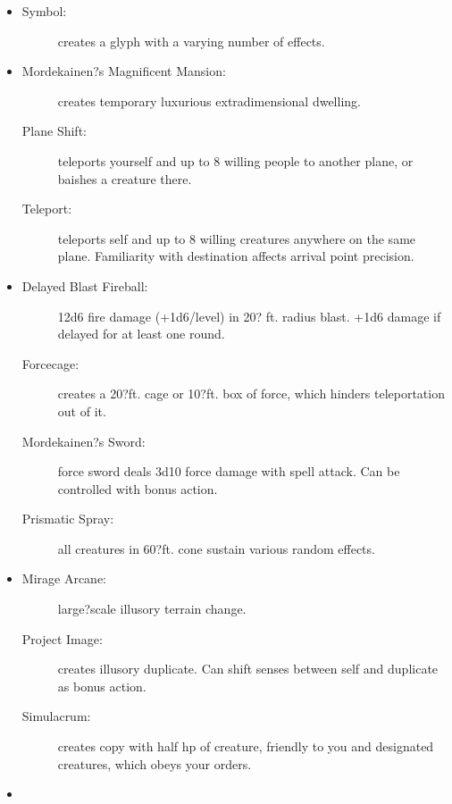 \documentclass[DIV=14, paper=a4, fontsize=10pt, twocolumn, twoside]{scrartcl}
\begin{document}
\begin{itemize}[align=parleft,labelwidth=1cm]
	\renewcommand{\labelitemi}{Abjur}\item
	\begin{description}
 \item[Symbol:] creates a glyph with a varying number of effects.
\end{description}
\renewcommand{\labelitemi}{Conj}\item
\begin{description}
 \item[Mordekainen?s Magnificent Mansion:] creates temporary luxurious extradimensional dwelling.
 \item[Plane Shift:] teleports yourself and up to 8 willing people to another plane, or baishes a creature there.
 \item[Teleport:] teleports self and up to 8 willing creatures anywhere on the same plane. Familiarity with destination affects arrival point precision.
\end{description}
\renewcommand{\labelitemi}{Evoc}\item
\begin{description}
 \item[Delayed Blast Fireball:] 12d6 fire damage (+1d6/level) in 20? ft. radius blast. +1d6 damage if delayed for at least one round.
 \item[Forcecage:] creates a 20?ft. cage or 10?ft. box of force, which hinders teleportation out of it.
 \item[Mordekainen?s Sword:] force sword deals 3d10 force damage with spell attack. Can be controlled with bonus action.
 \item[Prismatic Spray:] all creatures in 60?ft. cone sustain various random effects.
\end{description}
\renewcommand{\labelitemi}{Illus}\item
\begin{description}
 \item[Mirage Arcane:] large?scale illusory terrain change.
 \item[Project Image:] creates illusory duplicate. Can shift senses between self and duplicate as bonus action.
 \item[Simulacrum:] creates copy with half hp of creature, friendly to you and designated creatures, which obeys your orders.
\end{description}
\renewcommand{\labelitemi}{Necro}\item
\begin{description}

\end{description}
\end{itemize}
\end{document}
